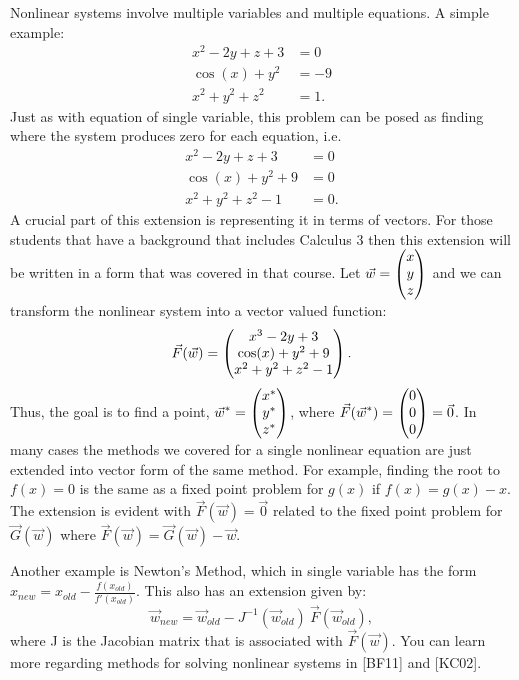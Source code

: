 \documentclass[twoside]{article}
\renewcommand{\cite}[1]{[#1]}
\def\ds{\displaystyle}
\begin{document}
Nonlinear systems involve multiple variables and multiple equations. A simple example:
\begin{align}
    x^2-2y+z+3 &= 0 \\
    \cos(x) + y^2 &= -9 \\
    x^2+y^2+z^2 & = 1.
\end{align}
Just as with equation of single variable, this problem can be posed as finding where the system produces zero for each equation, i.e.
\begin{align}
    x^2-2y+z+3 &= 0 \\
    \cos(x) + y^2 + 9 & = 0\\
    x^2+y^2+z^2 -1 & = 0.
\end{align}
A crucial part of this extension is representing it in terms of vectors. For those students that have a background that includes Calculus 3 then this extension will be written in a form that was covered in that course. Let $\ds \vec w = \begin{pmatrix} x \cr y \cr z \end{pmatrix}$ and we can transform the nonlinear system into a vector valued function:
$$\vec F(\vec w) = \begin{pmatrix} x^3 - 2y + 3 \cr \cos(x) + y^2 + 9 \cr x^2 + y^2 + z^2 -1  \end{pmatrix}.$$
Thus, the goal is to find a point, $\ds \vec w ^* = \begin{pmatrix} x^* \cr y^* \cr z^* \end{pmatrix}$, where $\ds \vec F(\vec w ^*) = \begin{pmatrix} 0 \cr 0 \cr 0 \end{pmatrix} = \vec 0$. In many cases the methods we covered for a single nonlinear equation are just extended into vector form of the same method. For example, finding the root to $f(x)=0$ is the same as a fixed point problem for $g(x)$ if $\ds f(x) = g(x)-x$. The extension is evident with $\vec F(\vec w) = \vec 0$ related to the fixed point problem for $\ds \vec G(\vec w)$ where $\ds \vec F(\vec w) = \vec G(\vec w)-\vec w$. \par 

Another example is Newton's Method, which in single variable has the form $\ds x_{new} = x_{old} - \frac {f(x_{old})}{f'(x_{old})}$. This also has an extension given by:
$$\vec w_{new} = \vec w_{old} - J^{-1}(\vec w_{old})\ \vec F(\vec w_{old}),$$
where J is the Jacobian matrix that is associated with $\ds \vec F(\vec w)$. You can learn more regarding methods for solving nonlinear systems in \cite{BF11} and \cite{KC02}. 
\end{document}
